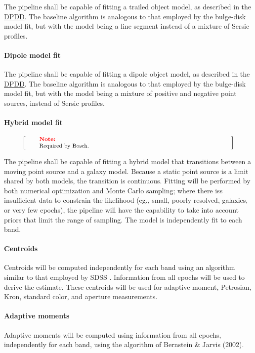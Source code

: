 \documentclass[12pt]{article}
\newcommand{\ds}[2]{{\color{blue} \href{https://docushare.lsstcorp.org/docushare/dsweb/Get/#1}{#2}}\xspace}
\newcommand{\DPDD}{\ds{LSE-163}{DPDD}}
\newenvironment{note}[1][Note]
{
  \begin{displaymath}
    \left[ \qquad
    \begin{minipage}[h]{.75\linewidth}
      \color{red} \footnotesize
      \textbf{#1:} \newline
      \color{black}
}
{
    \end{minipage}
    \normalsize
    \qquad \right]
  \end{displaymath}
}
\begin{document}
The pipeline shall be capable of fitting a trailed object model, as described in the \DPDD{}. The baseline algorithm is analogous to that employed by the bulge-disk model fit, but with the model being a line segment instead of a mixture of Sersic profiles.

\paragraph{Dipole model fit}

The pipeline shall be capable of fitting a dipole object model, as described in the \DPDD{}. The baseline algorithm is analogous to that employed by the bulge-disk model fit, but with the model being a mixture of positive and negative point sources, instead of Sersic profiles.

\paragraph{Hybrid model fit}

\begin{note}
Required by Bosch.
\end{note}

The pipeline shall be capable of fitting a hybrid model that transitions between a moving point source and a galaxy model. Because a static point source is a limit shared by both models, the transition is continuous. Fitting will be performed by both numerical optimization and Monte Carlo sampling; where there iss insufficient data to constrain the likelihood (eg., small, poorly resolved, galaxies, or very few epochs), the pipeline will have the capability to take into account priors that limit the range of sampling. The model is independently fit to each band.

\paragraph{Centroids} Centroids will be computed independently for each band using an algorithm similar to that employed by SDSS \cite{LuptonPhoto}. Information from all epochs will be used to derive the estimate. These centroids will be used for adaptive moment, Petrosian, Kron, standard color, and aperture measurements.

\paragraph{Adaptive moments} Adaptive moments will be computed using information from all epochs, independently for each band, using the algorithm of Bernstein \& Jarvis (2002).
\end{document}
